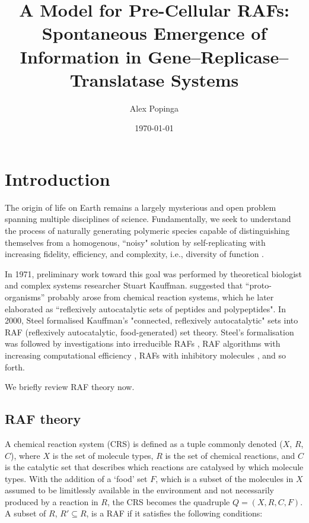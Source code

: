 \documentclass{article}
\begin{document}
\title{\huge{A Model for Pre-Cellular RAFs:}  \LARGE{Spontaneous Emergence of Information in Gene--Replicase--Translatase Systems}}
\author{Alex Popinga}
\date{\today}
\maketitle

\section{Introduction}
The origin of life on Earth remains a largely mysterious and open problem 
spanning multiple disciplines of science.  Fundamentally, we seek to understand the process of naturally generating polymeric species 
capable of distinguishing themselves from a homogenous, ``noisy" solution by self-replicating with increasing fidelity, efficiency, 
and complexity, i.e., diversity of function \citep{NASA}. %

In 1971, preliminary work toward this goal was performed by theoretical biologist and complex systems researcher Stuart Kauffman.  \citet*{Kauffman1971} suggested that ``proto-organisms'' probably arose from chemical reaction systems, 
which he later \citep{Kauffman1986} elaborated as ``reflexively autocatalytic sets of peptides and polypeptides".
In 2000, Steel formalised Kauffman's "connected, reflexively autocatalytic" sets \citep{Steel2000} into RAF (reflexively autocatalytic, food-generated) set theory.
Steel's formalisation was followed by investigations into irreducible RAFs \citep{Steel2013,Hordijk2014}, RAF algorithms with increasing computational efficiency \citep{Hordijk2004,Hordijk2015}, RAFs with inhibitory molecules \citep{Hordijk2012a,Hordijk2015}, and so forth.

We briefly review RAF theory now.

\subsection{RAF theory}
A chemical reaction system (CRS) is defined as a tuple commonly denoted ($X$, $R$, $C$), where $X$ is the set of molecule types, 
$R$ is the set of chemical reactions, and $C$ is the catalytic set that describes which reactions are catalysed by which molecule types. \citep{Hordijk2015}
With the addition of a `food' set $F$, which is a subset of the molecules in $X$ assumed to be limitlessly available in the environment and not necessarily produced by a reaction 
in $R$, the CRS becomes the quadruple $Q = (X, R, C, F)$.  A subset of $R$, $R' \subseteq R$, is a RAF if it satisfies the following conditions:
\end{document}
